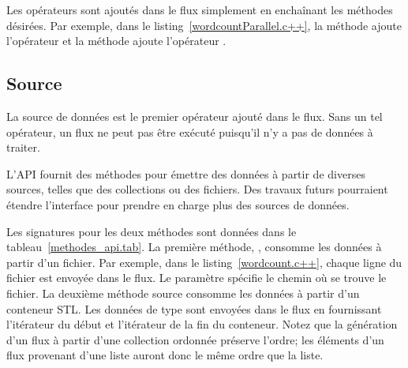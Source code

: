 Les op\'erateurs sont ajout\'es dans le flux simplement en encha\^inant les m\'ethodes d\'esir\'ees. Par exemple, dans le listing~\ref{wordcountParallel.c++}, la m\'ethode  ajoute l'opérateur  et la m\'ethode  ajoute l'op\'erateur . 





\subsection{Source}

La source de donn\'ees est le premier op\'erateur ajout\'e dans le flux. Sans un tel op\'erateur, un flux ne peut pas \^etre ex\'ecut\'e puisqu'il n'y a pas de donn\'ees \`a traiter. 

L'API fournit des m\'ethodes pour \'emettre des donn\'ees \`a partir de diverses sources, telles que des collections ou des fichiers. Des travaux futurs pourraient \'etendre l'interface pour prendre en charge plus des sources de donn\'ees. 



Les signatures pour les deux m\'ethodes sont donn\'ees dans le tableau~\ref{methodes_api.tab}. La premi\`ere m\'ethode, , consomme les donn\'ees \`a partir d'un fichier.  Par exemple, dans le listing~\ref{wordcount.c++}, chaque ligne du fichier  est envoy\'ee dans le flux. Le param\`etre  sp\'ecifie le chemin o\`u se trouve le fichier. La deuxi\`eme m\'ethode source consomme les donn\'ees \`a partir d'un conteneur STL. Les donn\'ees de type  sont envoy\'ees dans le flux en fournissant l'it\'erateur du d\'ebut et l'it\'erateur de la fin du conteneur. Notez que la g\'en\'eration d'un flux \`a partir d'une collection ordonn\'ee pr\'eserve l'ordre; les \'el\'ements d'un flux provenant d'une liste auront donc le m\^eme ordre que la liste.


